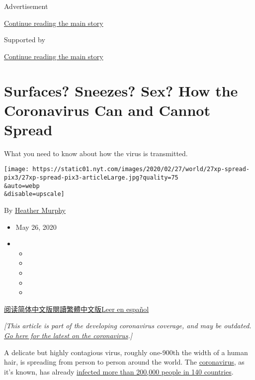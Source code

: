 Advertisement

\protect\hyperlink{after-top}{Continue reading the main story}

Supported by

\protect\hyperlink{after-sponsor}{Continue reading the main story}

\hypertarget{surfaces-sneezes-sex-how-the-coronavirus-can-and-cannot-spread}{%
\section{Surfaces? Sneezes? Sex? How the Coronavirus Can and Cannot
Spread}\label{surfaces-sneezes-sex-how-the-coronavirus-can-and-cannot-spread}}

What you need to know about how the virus is transmitted.

\texttt{[image: https://static01.nyt.com/images/2020/02/27/world/27xp-spread-pix3/27xp-spread-pix3-articleLarge.jpg?quality=75\\\&auto=webp\\\&disable=upscale]}

By \href{https://www.nytimes.com/by/heather-murphy}{Heather Murphy}

\begin{itemize}
\item
  May 26, 2020
\item
  \begin{itemize}
  \item
  \item
  \item
  \item
  \item
  \end{itemize}
\end{itemize}

\href{https://cn.nytimes.com/health/20200303/coronavirus-how-it-spreads/}{阅读简体中文版}\href{https://cn.nytimes.com/health/20200303/coronavirus-how-it-spreads/zh-hant/}{閱讀繁體中文版}\href{https://www.nytimes.com/es/2020/03/03/espanol/ciencia-y-tecnologia/coronavirus-como-se-transmite.html}{Leer
en español}

\emph{{[}This article is part of the developing coronavirus coverage,
and may be outdated.}
\href{https://www.nytimes.com/news-event/coronavirus}{\emph{Go here for
the latest on the coronavirus}}\emph{.{]}}

A delicate but highly contagious virus, roughly one-900th the width of a
human hair, is spreading from person to person around the world. The
\href{https://www.nytimes.com/2020/03/03/world/coronavirus-news.html}{coronavirus},
as it's known, has already
\href{https://www.nytimes.com/interactive/2020/world/coronavirus-maps.html}{infected
more than 200,000 people in 140 countries}.

